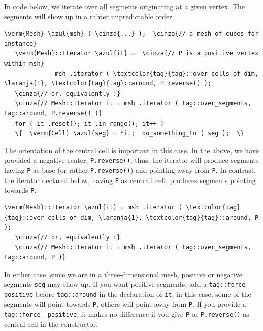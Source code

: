 In code below, we iterate over all segments originating at a given vertex.
The segments will show up in a rahter unpredictable order.

\begin{Verbatim}[commandchars=\\\{\},formatcom=\small\tt,
   baselinestretch=0.94,framesep=2mm                      ]
   \verm{Mesh} \azul{msh} ( \cinza{...} );  \cinza{// a mesh of cubes for instance}
   \verm{Mesh}::Iterator \azul{it} =  \cinza{// P is a positive vertex within msh}
              msh .iterator ( \textcolor{tag}{tag}::over_cells_of_dim, \laranja{1}, \textcolor{tag}{tag}::around, P.reverse() );
   \cinza{// or, equivalently :}
   \cinza{// Mesh::Iterator it = msh .iterator ( tag::over_segments, tag::around, P.reverse() )}
   for ( it .reset(); it .in_range(); it++ )
   \{  \verm{Cell} \azul{seg} = *it;  do_something_to ( seg );  \}
\end{Verbatim}

The orientation of the central cell is important in this case.
In the above, we have provided a negative center, {\small\tt P.reverse()};
thus, the iterator will produce segments {\small\tt{}} having {\small\tt P} as base
(or rather {\small\tt P.reverse()}) and pointing away from {\small\tt P}.
In contrast, the iterator declared below, having {\small\tt P} as centrall cell,
produces segments pointing towards {\small\tt P}.

\begin{Verbatim}[commandchars=\\\{\},formatcom=\small\tt,
   baselinestretch=0.94,framesep=2mm                      ]
   \verm{Mesh}::Iterator \azul{it} = msh .iterator ( \textcolor{tag}{tag}::over_cells_of_dim, \laranja{1}, \textcolor{tag}{tag}::around, P );
   \cinza{// or, equivalently :}
   \cinza{// Mesh::Iterator it = msh .iterator ( tag::over_segments, tag::around, P )}
\end{Verbatim}

In either case, since we are in a three-dimensional mesh, positive or negative segments
{\small\tt seg} may show up.
If you want positive segments, add a {\small\tt\textcolor{tag}{tag}::force\_\,positive} before
{\small\tt\textcolor{tag}{tag}::around} in the declaration of {\small\tt it};
in this case, some of the segments will point towards {\small\tt P},
others will point away from {\small\tt P}.
If you provide a {\small\tt\textcolor{tag}{tag}::force\_\,positive}, it makes no difference
if you give {\small\tt P} or {\small\tt P.reverse()} as central cell in the constructor.

